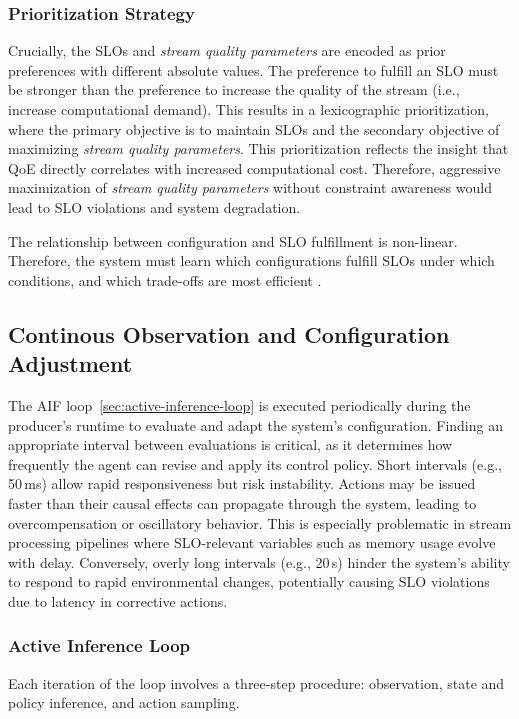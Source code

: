 \subsubsection{Prioritization Strategy}
Crucially, the SLOs and \textit{stream quality parameters} are encoded as prior preferences with different absolute values. The preference to fulfill an SLO must be stronger than the preference to increase the quality of the stream (i.e., increase computational demand). This results in a lexicographic prioritization, where the primary objective is to maintain SLOs and the secondary objective of maximizing \textit{stream quality parameters}. This prioritization reflects the insight that QoE directly correlates with increased computational cost. Therefore, aggressive maximization of \textit{stream quality parameters} without constraint awareness would lead to SLO violations and system degradation.

The relationship between configuration and SLO fulfillment is non-linear. Therefore, the system must learn which configurations fulfill SLOs under which conditions, and which trade-offs are most efficient \cite{sedlak_towards_2025}.

\subsection{Continous Observation and Configuration Adjustment}
The AIF loop~\ref{sec:active-inference-loop} is executed periodically during the producer's runtime to evaluate and adapt the system's configuration. Finding an appropriate interval between evaluations is critical, as it determines how frequently the agent can revise and apply its control policy. Short intervals (e.g., 50\,ms) allow rapid responsiveness but risk instability. Actions may be issued faster than their causal effects can propagate through the system, leading to overcompensation or oscillatory behavior. This is especially problematic in stream processing pipelines where SLO-relevant variables such as memory usage evolve with delay. Conversely, overly long intervals (e.g., 20\,s) hinder the system’s ability to respond to rapid environmental changes, potentially causing SLO violations due to latency in corrective actions. 

\subsubsection{Active Inference Loop}
Each iteration of the loop involves a three-step procedure: observation, state and policy inference, and action sampling.

